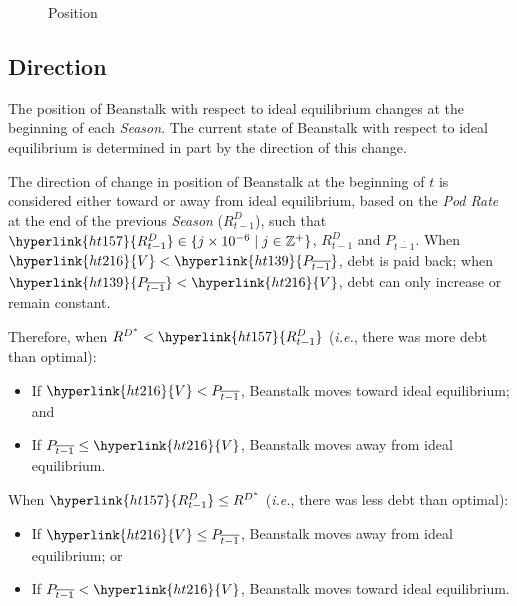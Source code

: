 \documentclass[tikz]{article}
\newcommand{\term}[1]{\textsl{#1}}
\begin{document}
\begin{figure}[h!]
    \centering
    
    \vspace*{-7mm}
    \caption{Position}
    \label{Fig 5}
\end{figure} 

\subsection{Direction}
The position of Beanstalk with respect to ideal equilibrium changes at the beginning of each \term{Season}. The current state of Beanstalk with respect to ideal equilibrium is determined in part by the direction of this change. 

The direction of change in position of Beanstalk at the beginning of \hyperlink{ht204}{$t$} is considered either toward or away from ideal equilibrium, based on the \term{Pod Rate} at the end of the previous \term{Season} (\hyperlink{ht157}{$R^D_{t-1}$}), such that $\hyperlink{ht157}{R^D_{t-1}} \in \{j \times 10^{-6} \mid j \in \mathbb{Z}^{+} \}$, \hyperlink{ht157}{$R^D_{t-1}$} and \hyperlink{ht139}{$P_{\overline{t-1}}$}. When $\hyperlink{ht216}{V} < \hyperlink{ht139}{P_{\overline{t-1}}}$, debt is paid back; when $\hyperlink{ht139}{P_{\overline{t-1}}} < \hyperlink{ht216}{V}$, debt can only increase or remain constant.

Therefore, when $R^{D^*} < \hyperlink{ht157}{R^D_{t-1}}$ (\term{i.e.}, there was more debt than optimal):
\begin{itemize}[topsep=0pt, itemsep=1pt]
    \item If $\hyperlink{ht216}{V} < P_{\overline{t-1}}$, Beanstalk moves toward ideal equilibrium; and
    \item If $P_{\overline{t-1}} \leq \hyperlink{ht216}{V}$, Beanstalk moves away from ideal equilibrium.
\end{itemize}
When $\hyperlink{ht157}{R^D_{t-1}} \leq R^{D^*}$ (\term{i.e.}, there was less debt than optimal):
\begin{itemize}[topsep=0pt, itemsep=1pt]
    \item If $\hyperlink{ht216}{V} \leq P_{\overline{t-1}}$, Beanstalk moves away from ideal equilibrium; or 
    \item If $P_{\overline{t-1}} < \hyperlink{ht216}{V}$, Beanstalk moves toward ideal equilibrium.
\end{itemize}
\end{document}
